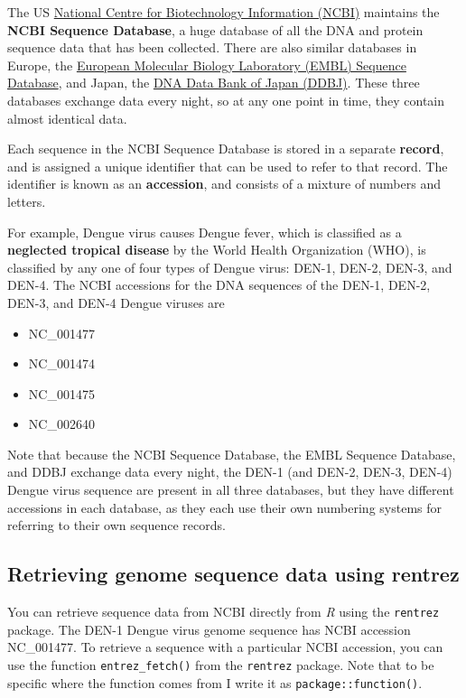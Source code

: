 \documentclass[
]{book}
\providecommand{\tightlist}{%
  \setlength{\itemsep}{0pt}\setlength{\parskip}{0pt}}
\begin{document}
The US \href{www.ncbi.nlm.nih.gov}{National Centre for Biotechnology Information (NCBI)} maintains the \textbf{NCBI Sequence Database}, a huge database of all the DNA and protein sequence data that has been collected. There are also similar databases in Europe, the \href{www.ebi.ac.uk/embl}{European Molecular Biology Laboratory (EMBL) Sequence Database}, and Japan, the \href{www.ddbj.nig.ac.jp}{DNA Data Bank of Japan (DDBJ)}. These three databases exchange data every night, so at any one point in time, they contain almost identical data.

Each sequence in the NCBI Sequence Database is stored in a separate \textbf{record}, and is assigned a unique identifier that can be used to refer to that record. The identifier is known as an \textbf{accession}, and consists of a mixture of numbers and letters.

For example, Dengue virus causes Dengue fever, which is classified as a \textbf{neglected tropical disease} by the World Health Organization (WHO), is classified by any one of four types of Dengue virus: DEN-1, DEN-2, DEN-3, and DEN-4. The NCBI accessions for the DNA sequences of the DEN-1, DEN-2, DEN-3, and DEN-4 Dengue viruses are

\begin{itemize}
\tightlist
\item
  NC\_001477
\item
  NC\_001474
\item
  NC\_001475\\
\item
  NC\_002640
\end{itemize}

Note that because the NCBI Sequence Database, the EMBL Sequence Database, and DDBJ exchange data every night, the DEN-1 (and DEN-2, DEN-3, DEN-4) Dengue virus sequence are present in all three databases, but they have different accessions in each database, as they each use their own numbering systems for referring to their own sequence records.

\hypertarget{retrieving-genome-sequence-data-using-rentrez}{%
\subsection{Retrieving genome sequence data using rentrez}\label{retrieving-genome-sequence-data-using-rentrez}}

You can retrieve sequence data from NCBI directly from \emph{R} using the \texttt{rentrez} package. The DEN-1 Dengue virus genome sequence has NCBI accession NC\_001477. To retrieve a sequence with a particular NCBI accession, you can use the function \texttt{entrez\_fetch()} from the \texttt{rentrez} package. Note that to be specific where the function comes from I write it as \texttt{package::function()}.
\end{document}
